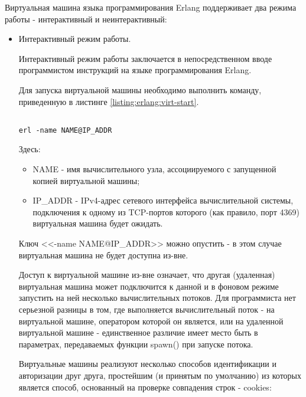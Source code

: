 
Виртуальная машина языка программирования Erlang поддерживает два режима работы - интерактивный и неинтерактивный:

\begin{itemize}

	\item Интерактивный режим работы.

	Интерактивный режим работы заключается в непосредственном вводе программистом инструкций на языке программирования Erlang.

	Для запуска виртуальной машины необходимо выполнить команду, приведенную в листинге \ref{listing:erlang:virt-start}.

\begin{lstlisting}

erl -name NAME@IP_ADDR

\end{lstlisting}
\mylistingend

	Здесь:
	
	\begin{itemize}
	
		\item NAME - имя вычислительного узла, ассоциируемого с запущенной копией виртуальной машины;
		\item IP\_ADDR - IPv4-адрес сетевого интерфейса вычислительной системы, подключения к одному из TCP-портов которого (как правило, порт 4369) виртуальная машина будет ожидать.

	\end{itemize}

	Ключ <<-name NAME@IP\_ADDR>> можно опустить - в этом случае виртуальная машина не будет доступна из-вне.

	Доступ к виртуальной машине из-вне означает, что другая (удаленная) виртуальная машина может подключится к данной и в фоновом режиме запустить на ней несколько вычислительных потоков. Для программиста нет серьезной разницы в том, где выполняется вычислительный поток - на виртуальной машине, оператором которой он является, или на удаленной виртуальной машине - единственное различие имеет место быть в параметрах, передаваемых функции spawn() при запуске потока.

	Виртуальные машины реализуют несколько способов идентификации и авторизации друг друга, простейшим (и принятым по умолчанию) из которых является способ, основанный на проверке совпадения строк - cookies:


\end{itemize}
